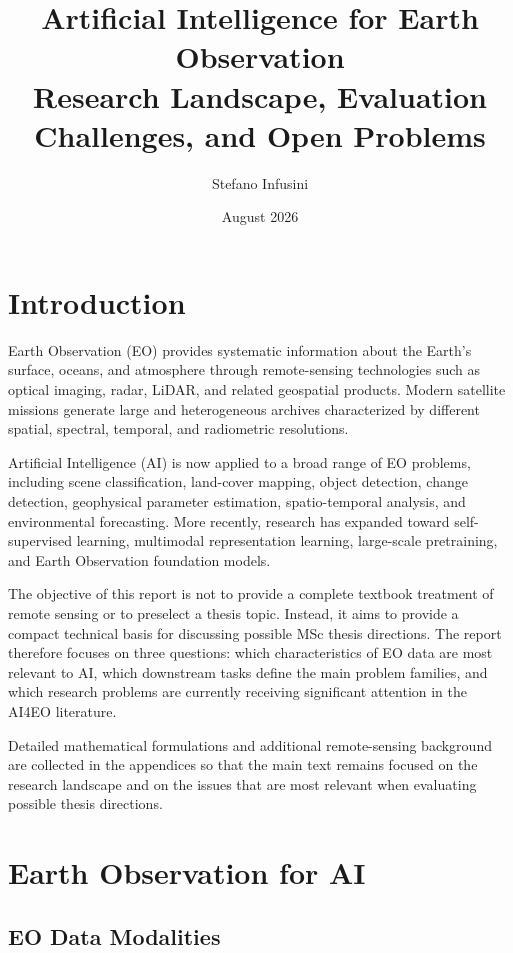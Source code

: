 \documentclass[11pt,a4paper]{article}
\title{
    \textbf{Artificial Intelligence for Earth Observation}\\
    \vspace{0.3cm}
    \large Research Landscape, Evaluation Challenges, and Open Problems
}
\author{Stefano Infusini}
\date{August 2026}
\begin{document}
\maketitle
\tableofcontents
\newpage

\section{Introduction}

Earth Observation (EO) provides systematic information about the Earth's
surface, oceans, and atmosphere through remote-sensing technologies such
as optical imaging, radar, LiDAR, and related geospatial products.
Modern satellite missions generate large and heterogeneous archives
characterized by different spatial, spectral, temporal, and radiometric
resolutions.

Artificial Intelligence (AI) is now applied to a broad range of EO
problems, including scene classification, land-cover mapping, object
detection, change detection, geophysical parameter estimation,
spatio-temporal analysis, and environmental forecasting. More recently,
research has expanded toward self-supervised learning, multimodal
representation learning, large-scale pretraining, and Earth Observation
foundation models.

The objective of this report is not to provide a complete textbook
treatment of remote sensing or to preselect a thesis topic. Instead, it
aims to provide a compact technical basis for discussing possible MSc
thesis directions. The report therefore focuses on three questions:
which characteristics of EO data are most relevant to AI, which
downstream tasks define the main problem families, and which research
problems are currently receiving significant attention in the AI4EO
literature.

Detailed mathematical formulations and additional remote-sensing
background are collected in the appendices so that the main text remains
focused on the research landscape and on the issues that are most
relevant when evaluating possible thesis directions.

\section{Earth Observation for AI}

\subsection{EO Data Modalities}
\end{document}
